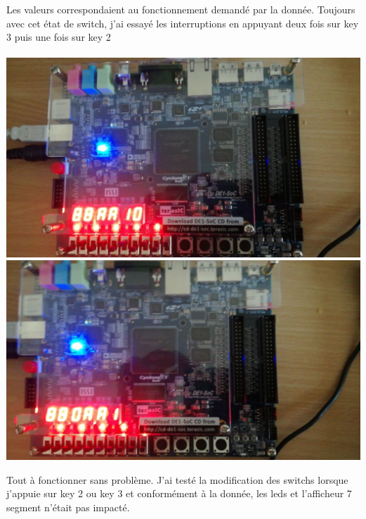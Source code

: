 Les valeurs correspondaient au fonctionnement demandé par la donnée. Toujours avec cet état de switch, j'ai essayé les interruptions en appuyant deux fois sur key 3 puis une fois sur key 2\\\\
\includegraphics[scale=0.3]{./images/appuiKey3.jpeg}
\includegraphics[scale=0.3]{./images/appuiKey2.jpeg}

Tout à fonctionner sans problème. J'ai testé la modification des switchs lorsque j'appuie sur key 2 ou key 3 et conformément à la donnée, les leds et l'afficheur 7 segment n'était pas impacté.